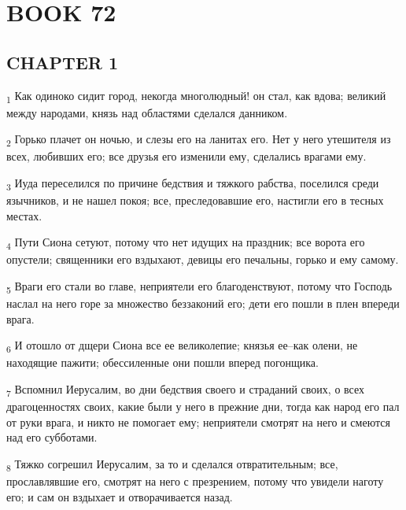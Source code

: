 \section{BOOK 72}
\subsection{CHAPTER 1}
\begin{tcolorbox}
\textsubscript{1} Как одиноко сидит город, некогда многолюдный! он стал, как вдова; великий между народами, князь над областями сделался данником.
\end{tcolorbox}
\begin{tcolorbox}
\textsubscript{2} Горько плачет он ночью, и слезы его на ланитах его. Нет у него утешителя из всех, любивших его; все друзья его изменили ему, сделались врагами ему.
\end{tcolorbox}
\begin{tcolorbox}
\textsubscript{3} Иуда переселился по причине бедствия и тяжкого рабства, поселился среди язычников, и не нашел покоя; все, преследовавшие его, настигли его в тесных местах.
\end{tcolorbox}
\begin{tcolorbox}
\textsubscript{4} Пути Сиона сетуют, потому что нет идущих на праздник; все ворота его опустели; священники его вздыхают, девицы его печальны, горько и ему самому.
\end{tcolorbox}
\begin{tcolorbox}
\textsubscript{5} Враги его стали во главе, неприятели его благоденствуют, потому что Господь наслал на него горе за множество беззаконий его; дети его пошли в плен впереди врага.
\end{tcolorbox}
\begin{tcolorbox}
\textsubscript{6} И отошло от дщери Сиона все ее великолепие; князья ее--как олени, не находящие пажити; обессиленные они пошли вперед погонщика.
\end{tcolorbox}
\begin{tcolorbox}
\textsubscript{7} Вспомнил Иерусалим, во дни бедствия своего и страданий своих, о всех драгоценностях своих, какие были у него в прежние дни, тогда как народ его пал от руки врага, и никто не помогает ему; неприятели смотрят на него и смеются над его субботами.
\end{tcolorbox}
\begin{tcolorbox}
\textsubscript{8} Тяжко согрешил Иерусалим, за то и сделался отвратительным; все, прославлявшие его, смотрят на него с презрением, потому что увидели наготу его; и сам он вздыхает и отворачивается назад.
\end{tcolorbox}
